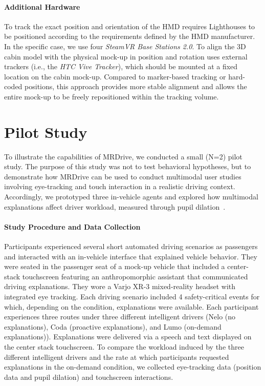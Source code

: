 \documentclass[sigconf, screen]{acmart}
\begin{document}
\paragraph{\textbf{Additional Hardware}}
To track the exact position and orientation of the \gls{HMD} \name requires Lighthouses to be positioned according to the requirements defined by the \gls{HMD} manufacturer. In the specific case, we use four \textit{SteamVR Base Stations 2.0}.
%
To align the 3D cabin model with the physical mock-up in position and rotation \name uses external trackers (i.e., the \textit{HTC Vive Tracker}), which should be mounted at a fixed location on the cabin mock-up. Compared to marker-based tracking or hard-coded positions, this approach provides more stable alignment and allows the entire mock-up to be freely repositioned within the tracking volume.



\section{Pilot Study}
To illustrate the capabilities of MRDrive, we conducted a small (N=2) pilot study. The purpose of this study was not to test behavioral hypotheses, but to demonstrate how MRDrive can be used to conduct multimodal user studies involving eye-tracking and touch interaction in a realistic driving context. Accordingly, we prototyped three in-vehicle agents and explored how multimodal explanations affect driver workload, measured through pupil dilation~\cite{pomplun2019pupil}.

\paragraph{\textbf{Study Procedure and Data Collection}}
Participants experienced several short automated driving scenarios as passengers and interacted with an in-vehicle interface that explained vehicle behavior. They were seated in the passenger seat of a mock-up vehicle that included a center-stack touchscreen featuring an anthropomorphic assistant that communicated driving explanations. They wore a Varjo XR-3 mixed-reality headset with integrated eye tracking. Each driving scenario included 4 safety-critical events for which, depending on the condition, explanations were available.
%
Each participant experiences three routes under three different intelligent drivers (Nelo (no explanations), Coda (proactive explanations), and Lumo (on-demand explanations)). Explanations were delivered via a speech and text displayed on the center stack touchscreen.
%
To compare the workload induced by the three different intelligent drivers and the rate at which participants requested explanations in the on-demand condition, we collected eye-tracking data (position data and pupil dilation) and touchscreen interactions.
\end{document}
